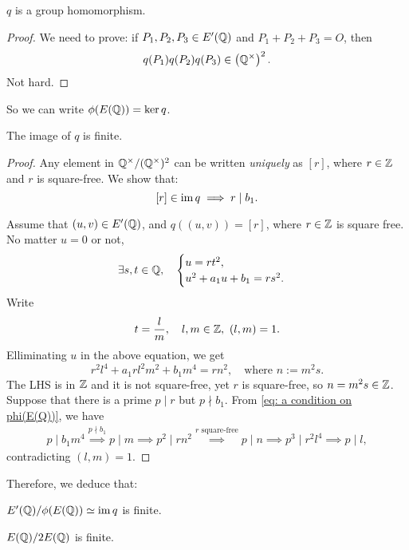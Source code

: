 \begin{lemma}
    $q$ is a group homomorphism.
\end{lemma}
\begin{proof}
    We need to prove: if $P_1, P_2, P_3\in E'(\mathbb{Q})$ and $P_1 + P_2  + P_3 = O$,
    then \[q(P_1)q(P_2)q(P_3) \in \left( \mathbb{Q}^\times \right)^2.\]
    Not hard.
\end{proof}

So we can write $\phi(E(\mathbb{Q})) = \ker q$.
\begin{lemma}\label{E'(Q) to Q/Q2 has finite image}
    The image of $q$ is finite.
\end{lemma}
\begin{proof}
    Any element in $\mathbb{Q}^\times/(\mathbb{Q}^\times)^2$ can be written \textit{uniquely} as $[r]$,
    where $r\in\mathbb{Z}$ and $r$ is square-free.
    We show that: \[[r]\in\operatorname{im} q\implies r\mid b_1.\]
    
    Assume that $(u, v)\in E'(\mathbb{Q})$, and $q((u, v)) = [r]$,
    where $r\in\mathbb{Z}$ is square free.
    No matter $u = 0$ or not,\[\exists s, t\in\mathbb{Q},\quad \begin{cases}
        u = rt^2,\\u^2 + a_1u + b_1 = rs^2.
    \end{cases}\]
    Write \[t = \dfrac{l}{m}, \quad l, m\in\mathbb{Z},\  (l, m) = 1.\]
    Elliminating $u$ in the above equation, we get\begin{equation}\label{eq: a condition on phi(E(Q))}
        r^2l^4 + a_1rl^2m^2 + b_1m^4 = rn^2,\quad\text{where }n := m^2s.
    \end{equation}
    The LHS is in $\mathbb{Z}$ and it is not square-free,
    yet $r$ is square-free, so $n = m^2s\in\mathbb{Z}$.
    Suppose that there is a prime $p\mid r$ but $p\nmid b_1$.
    From \cref{eq: a condition on phi(E(Q))},
    we have \begin{align}
        p\mid b_1m^4\stackrel{p\nmid b_1}{\implies}
        p\mid m\implies
        p^2\mid rn^2\stackrel{r\text{ square-free}}{\implies}
        p\mid n\implies
        p^3\mid r^2l^4\implies
        p\mid l,
    \end{align}
    contradicting $(l , m) = 1$.
\end{proof}



Therefore, we deduce that:\begin{theorem}
    $E'(\mathbb{Q})/\phi(E(\mathbb{Q}))\simeq \operatorname{im} q$ is finite.
\end{theorem}

\begin{corollary}
    $E(\mathbb{Q})/2E(\mathbb{Q})$ is finite.
\end{corollary}

